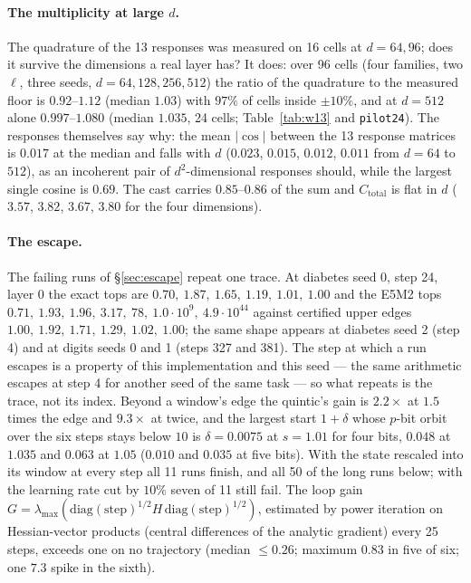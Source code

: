 \paragraph{The multiplicity at large $d$.}  The quadrature of the 13 responses was
measured on 16 cells at $d=64,96$; does it survive the dimensions a real layer has?  It
does: over 96 cells (four families, two $\ell$, three seeds, $d=64,128,256,512$) the ratio
of the quadrature to the measured floor is $0.92$--$1.12$ (median $1.03$) with $97\%$ of
cells inside $\pm10\%$, and at $d=512$ alone $0.997$--$1.080$ (median $1.035$, 24 cells;
Table~\ref{tab:w13} and \texttt{pilot24}).  The responses themselves say why: the mean
$|\cos|$ between the 13 response matrices is $0.017$ at the median and falls with $d$
($0.023$, $0.015$, $0.012$, $0.011$ from $d=64$ to $512$), as an incoherent pair of
$d^2$-dimensional responses should, while the largest single cosine is $0.69$.  The cast carries
$0.85$--$0.86$ of the sum and $C_{\mathrm{total}}$ is flat in $d$ ($3.57$, $3.82$,
$3.67$, $3.80$ for the four dimensions).

\paragraph{The escape.}  The failing runs of \S\ref{sec:escape} repeat one trace.  At
diabetes seed 0, step 24, layer 0 the exact tops are
$0.70,\ 1.87,\ 1.65,\ 1.19,\ 1.01,\ 1.00$ and the E5M2 tops
$0.71,\ 1.93,\ 1.96,\ 3.17,\ 78,\ 1.0\cdot10^{9},\ 4.9\cdot10^{44}$ against certified
upper edges $1.00,\ 1.92,\ 1.71,\ 1.29,\ 1.02,\ 1.00$; the same shape appears at diabetes
seed 2 (step 4) and at digits seeds 0 and 1 (steps 327 and 381).  The step at which a run
escapes is a property of this implementation and this seed --- the same arithmetic escapes
at step 4 for another seed of the same task --- so what repeats is the trace, not its
index.  Beyond a window's edge
the quintic's gain is $2.2\times$ at $1.5$ times the edge and $9.3\times$ at twice, and
the largest start $1+\delta$ whose $p$-bit orbit over the six steps stays below $10$ is
$\delta=0.0075$ at $s=1.01$ for four bits, $0.048$ at $1.035$ and $0.063$ at $1.05$
($0.010$ and $0.035$ at five bits).  With the state rescaled into its window at every step
all 11 runs finish, and all 50 of the long runs below; with the learning rate cut by $10\%$
seven of 11 still fail.  The loop
gain $G=\lambda_{\max}(\mathrm{diag}(\mathrm{step})^{1/2}H\,\mathrm{diag}(\mathrm{step})^{1/2})$,
estimated by power iteration on Hessian-vector products (central differences of the
analytic gradient) every 25 steps, exceeds one on no trajectory (median $\le0.26$; maximum
$0.83$ in five of six; one $7.3$ spike in the sixth).

